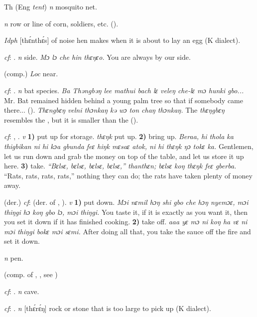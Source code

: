 \begin{letter}{Th}
 (Eng \textit{tent}) \textit{n} mosquito net.

 \textit{n} row or line of corn, soldiers, etc. (\citealt{Pichl1967}). 

 \textit{Idph} [thɛ́nthɛ́s] of noise hen makes when it is about to lay an egg (K dialect).

 \textit{cf}: . \textit{n} side. \textit{Mɔ lɔ che hin thɛŋɛo.} You are always by our side.

 (comp.) \textit{Loc} near.

 \textit{cf}: . \textit{n} bat species. \textit{Ba Thəngbəŋ lee mathui bach lɛ veleŋ che-lɛ mɔ hunki gbo...} Mr. Bat remained hidden behind a young palm tree so that if somebody came there... (\citealt{Pichl1967}). \textit{Thɛngbɛŋ velni thɔnkaŋ kə wɔ ton chaŋ thɔnkaŋ.} The \textit{thɛŋgbɛŋ} resembles the , but it is smaller than the  (\citealt{Pichl1967}). 

 \textit{cf}: , . \textit{v} \textbf{1)} put up for storage. \textit{thɛŋk} put up. \textbf{2)} bring up. \textit{Beraa, hi thola ka thigbikan ni hi kɔa gbunda feɛ hiŋk mɛsaɛ atok, ni hi thɛŋk ŋɔ tokɛ ka.} Gentlemen, let us run down and grab the money on top of the table, and let us store it up here. \textbf{3)} take. \textit{“Bɛlsɛ, bɛlsɛ, bɛlsɛ, bɛlsɛ,” thanthɛn; bɛlsɛ koŋ thɛŋk feɛ gberba.} “Rats, rats, rats, rats,” nothing they can do; the rats have taken plenty of money away.

 (der.) \textit{cf}:  (der. of , ). \textit{v} \textbf{1)} put down. \textit{Mɔi nɛmil hɔŋ shi gbo che hɔŋ nyemɔɛ, mɔi thiŋgi hɔ koŋ gbo lɔ, mɔi thiŋgi.} You taste it, if it is exactly as you want it, then you set it down if it has finished cooking. \textbf{2)} take off. \textit{aaa yɛ mɔ ni koŋ ha vɛ ni mɔi thiŋgi bokɛ mɔi sɛmi.} After doing all that, you take the sauce off the fire and set it down.

 \textit{n} pen.

 (comp. of , , see ) 

 \textit{cf}: . \textit{n} cave.

 \textit{cf}: . \textit{n} [thɛ́rɛ́ŋ] rock or stone that is too large to pick up (K dialect).


\end{letter}
